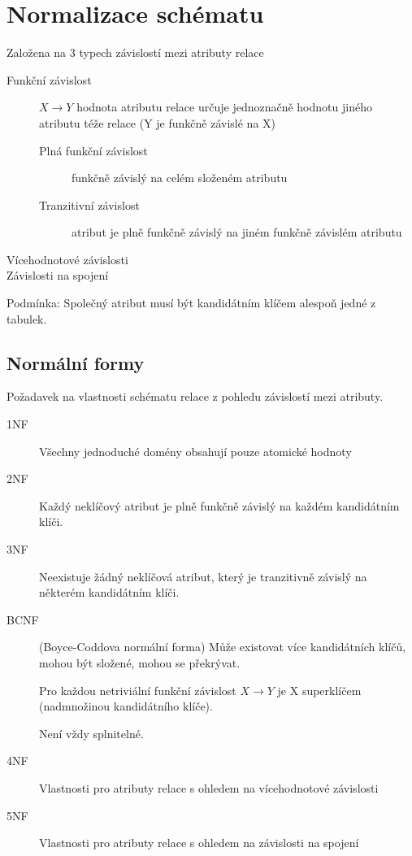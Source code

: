 \documentclass[a4paper, 11pt]{report}
\begin{document}
\section{Normalizace schématu}
Založena na 3 typech závislostí mezi atributy relace
\begin{description}
	\item[Funkční závislost] $X \to Y$ hodnota atributu relace určuje jednoznačně hodnotu jiného atributu téže relace (Y je funkčně závislé na X)
	\begin{description}
		\item[Plná funkční závislost] funkčně závislý na celém složeném atributu
		\item[Tranzitivní závislost] atribut je plně funkčně závislý na jiném funkčně závislém atributu
	\end{description}
	\item[Vícehodnotové závislosti]
	\item[Závislosti na spojení]
\end{description}

Podmínka: Společný atribut musí být kandidátním klíčem alespoň jedné z tabulek.

\subsection{Normální formy}
Požadavek na vlastnosti schématu relace z pohledu závislostí mezi atributy.

\begin{description}
	\item[1NF] Všechny jednoduché domény obsahují pouze atomické hodnoty
	\item[2NF] Každý neklíčový atribut je plně funkčně závislý na každém kandidátním klíči.
	\item[3NF] Neexistuje žádný neklíčová atribut, který je tranzitivně závislý na některém kandidátním klíči.
	\item[BCNF] (Boyce-Coddova normální forma) Může existovat více kandidátních klíčů, mohou být složené, mohou se překrývat.
	
	Pro každou netriviální funkční závislost $X \to Y$ je X superklíčem (nadmnožinou kandidátního klíče).
	
	Není vždy splnitelné.
	
	\item[4NF] Vlastnosti pro atributy relace s ohledem na vícehodnotové závislosti
	\item[5NF] Vlastnosti pro atributy relace s ohledem na závislosti na spojení
\end{description}
\end{document}
